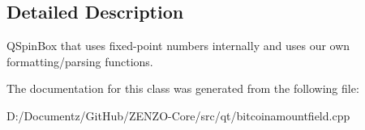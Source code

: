 \subsection{Detailed Description}
Q\+Spin\+Box that uses fixed-\/point numbers internally and uses our own formatting/parsing functions. 

The documentation for this class was generated from the following file\+:\begin{DoxyCompactItemize}
\item 
D\+:/\+Documentz/\+Git\+Hub/\+Z\+E\+N\+Z\+O-\/\+Core/src/qt/bitcoinamountfield.\+cpp\end{DoxyCompactItemize}
